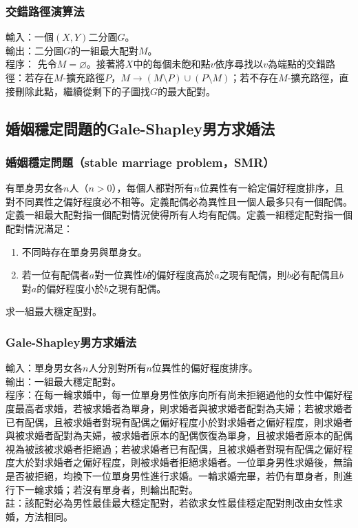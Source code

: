 \documentclass[a4paper,12pt]{report}
\begin{document}
\subsubsection{交錯路徑演算法}
輸入：一個$(X, Y)$二分圖$G$。 \\
輸出：二分圖$G$的一組最大配對$M$。 \\
程序： 先令$M=\varnothing$。接著將$X$中的每個未飽和點$v$依序尋找以$v$為端點的交錯路徑：若存在$M$-擴充路徑$P$，$M\rightarrow(M\setminus P)\cup(P\setminus M)$；若不存在$M$-擴充路徑，直接刪除此點，繼續從剩下的子圖找$G$的最大配對。
\subsection{婚姻穩定問題的Gale-Shapley男方求婚法}
\subsubsection{婚姻穩定問題（stable marriage problem，SMR）}
有單身男女各$n$人（$n>0$），每個人都對所有$n$位異性有一給定偏好程度排序，且對不同異性之偏好程度必不相等。定義配偶必為異性且一個人最多只有一個配偶。定義一組最大配對指一個配對情況使得所有人均有配偶。定義一組穩定配對指一個配對情況滿足：
\begin{enumerate}[label=(\arabic*)]
\item 不同時存在單身男與單身女。
\item 若一位有配偶者$a$對一位異性$b$的偏好程度高於$a$之現有配偶，則$b$必有配偶且$b$對$a$的偏好程度小於$b$之現有配偶。
\end{enumerate}
求一組最大穩定配對。
\subsubsection{Gale-Shapley男方求婚法}
輸入：單身男女各$n$人分別對所有$n$位異性的偏好程度排序。 \\
輸出：一組最大穩定配對。 \\
程序：在每一輪求婚中，每一位單身男性依序向所有尚未拒絕過他的女性中偏好程度最高者求婚，若被求婚者為單身，則求婚者與被求婚者配對為夫婦；若被求婚者已有配偶，且被求婚者對現有配偶之偏好程度小於對求婚者之偏好程度，則求婚者與被求婚者配對為夫婦，被求婚者原本的配偶恢復為單身，且被求婚者原本的配偶視為被該被求婚者拒絕過；若被求婚者已有配偶，且被求婚者對現有配偶之偏好程度大於對求婚者之偏好程度，則被求婚者拒絕求婚者。一位單身男性求婚後，無論是否被拒絕，均換下一位單身男性進行求婚。一輪求婚完畢，若仍有單身者，則進行下一輪求婚；若沒有單身者，則輸出配對。 \\
註：該配對必為男性最佳最大穩定配對，若欲求女性最佳穩定配對則改由女性求婚，方法相同。
\end{document}
